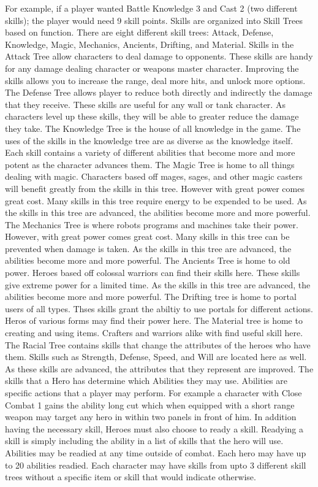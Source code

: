 For example, if a player wanted Battle Knowledge 3 and Cast 2 (two different
skills); the player would need 9 skill points.  Skills are organized into Skill
Trees based on function.  There are eight different skill trees:
Attack, Defense, Knowledge, Magic, Mechanics, Ancients, Drifting, and Material.  Skills in the
Attack Tree allow characters to deal damage to opponents.  These skills are
handy for any damage dealing character or weapons master character.  Improving
the skills allows you to increase the range, deal more hits, and unlock more
options.  The Defense Tree allows player to reduce both directly and indirectly
the damage that they receive.  These skills are useful for any wall or tank
character.  As characters level up these skills, they will be able to greater
reduce the damage they take.  The Knowledge Tree is the house of all knowledge
in the game.  The uses of the skills in the knowledge tree are as diverse as
the knowledge itself.  Each skill contains a variety of different abilities
that become more and more potent as the character advances them.  The Magic
Tree is home to all things dealing with magic.  Characters based off
mages, sages, and other magic casters will benefit greatly from the skills in
this tree.  However with great power comes great cost.  Many skills in this
tree require energy to be expended to be used.  As the skills in this tree are
advanced, the abilities become more and more powerful.  The Mechanics Tree is
where robots programs and machines take their power.  However, with great power
comes great cost.  Many skills in this tree can be prevented when damage is
taken.  As the skills in this tree are advanced, the abilities become more and
more powerful.  The Ancients Tree is home to old power.  Heroes based off
colossal warriors can find their skills here.  These skills give extreme power
for a limited time.  As the skills in this tree are advanced, the abilities
become more and more powerful.  The Drifting tree is home to portal users of
all types.  Thses skills grant the abiltiy to use portals for different
actions.  Heros of various forms may find their power here.  The Material tree
is home to creating and using items.  Crafters and warriors alike with find
useful skill here. The Racial Tree contains skills that change the
attributes of the heroes who have them.  Skills such as Strength, Defense,
Speed, and Will are located here as well.  As these skills are advanced, the
attributes that they represent are improved.  The skills that a Hero has
determine which Abilities they may use.  Abilities are specific actions that a
player may perform.  For example a character with Close Combat 1 gains the
ability long cut which when equipped with a short range weapon may target any
hero in within two panels in front of him.  In addition having the necessary
skill, Heroes must also choose to ready a skill.  Readying a skill is simply
including the ability in a list of skills that the hero will use.  Abilities
may be readied at any time outside of combat.  Each hero may have up to 20
abilities readied.  Each character may have skills from upto 3 different skill
trees without a specific item or skill that would indicate otherwise.

